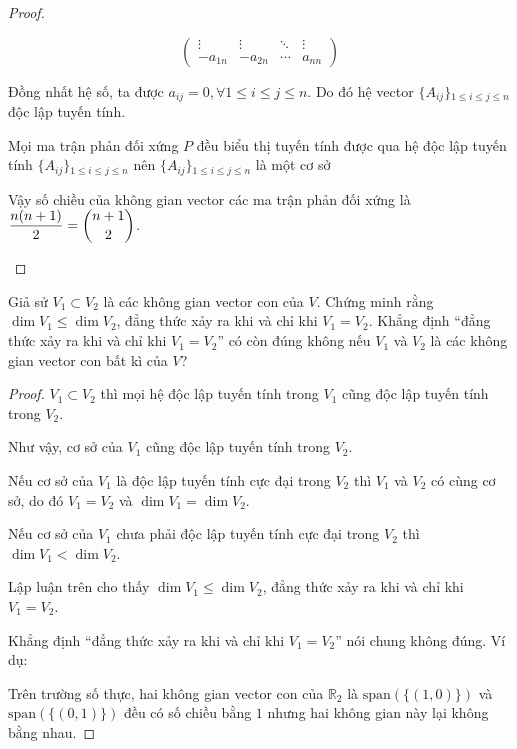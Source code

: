 \documentclass[class=linearalgebra,crop=false]{standalone}
\begin{document}
\begin{proof}
\begin{enumerate}
\[\begin{pmatrix}
                      \vdots  & \vdots  & \ddots & \vdots \\
                      -a_{1n} & -a_{2n} & \cdots & a_{nn}
                  \end{pmatrix}
              \]
              \par Đồng nhất hệ số, ta được $a_{ij} = 0, \forall 1\le i\le j\le n$. Do đó hệ vector $\{ A_{ij} \}{}_{1\le i \le j \le n}$ độc lập tuyến tính.
              \par Mọi ma trận phản đối xứng $P$ đều biểu thị tuyến tính được qua hệ độc lập tuyến tính $\{ A_{ij} \}{}_{1\le i \le j \le n}$ nên $\{ A_{ij} \}{}_{1\le i \le j\le n}$ là một cơ sở
              \par Vậy số chiều của không gian vector các ma trận phản đối xứng là $\dfrac{n(n + 1)}{2} = \dbinom{n+1}{2}$.
    \end{enumerate}
\end{proof}

\begin{exercise}Giả sử $V_{1}\subset V_{2}$ là các không gian vector con của $V$. Chứng minh rằng $\dim V_{1} \le \dim V_{2}$, đẳng thức xảy ra khi và chỉ khi $V_{1} = V_{2}$. Khẳng định ``đẳng thức xảy ra khi và chỉ khi $V_{1} = V_{2}$'' có còn đúng không nếu $V_{1}$ và $V_{2}$ là các không gian vector con bất kì của $V$?
\end{exercise}

\begin{proof}$V_{1}\subset V_{2}$ thì mọi hệ độc lập tuyến tính trong $V_{1}$ cũng độc lập tuyến tính trong $V_{2}$.
    \par Như vậy, cơ sở của $V_{1}$ cũng độc lập tuyến tính trong $V_{2}$.
    \par Nếu cơ sở của $V_{1}$ là độc lập tuyến tính cực đại trong $V_{2}$ thì $V_{1}$ và $V_{2}$ có cùng cơ sở, do đó $V_{1} = V_{2}$ và $\dim V_{1} = \dim V_{2}$.
    \par Nếu cơ sở của $V_{1}$ chưa phải độc lập tuyến tính cực đại trong $V_{2}$ thì $\dim V_{1} < \dim V_{2}$.
    \par Lập luận trên cho thấy $\dim V_{1} \le \dim V_{2}$, đẳng thức xảy ra khi và chỉ khi $V_{1} = V_{2}$.
    \par Khẳng định ``đẳng thức xảy ra khi và chỉ khi $V_{1} = V_{2}$'' nói chung không đúng. Ví dụ:
    \par Trên trường số thực, hai không gian vector con của $\mathbb{R}_{2}$ là $\text{span}(\{ (1,0) \})$ và $\text{span}(\{ (0,1) \})$ đều có số chiều bằng $1$ nhưng hai không gian này lại không bằng nhau.
\end{proof}
\end{document}
